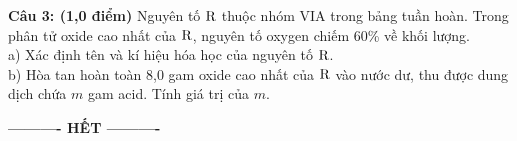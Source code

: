 \documentclass[11pt,a4paper]{article}
\begin{document}
\vspace{1pt}
\noindent
{}

\vspace{4pt}
\noindent
\textbf{Câu 3: (1,0 điểm)} Nguyên tố $\ce{R}$ thuộc nhóm VIA trong bảng tuần hoàn. Trong phân tử oxide cao nhất của $\ce{R}$, nguyên tố oxygen chiếm 60\% về khối lượng.\\
a) Xác định tên và kí hiệu hóa học của nguyên tố $\ce{R}$.\\
b) Hòa tan hoàn toàn 8,0 gam oxide cao nhất của $\ce{R}$ vào nước dư, thu được dung dịch chứa $m$ gam acid. Tính giá trị của $m$.

\vspace{1pt}
\noindent
{}

\vspace{6pt}
\begin{center}
\textbf{\large ---------- HẾT ----------}
\end{center}
\end{document}
